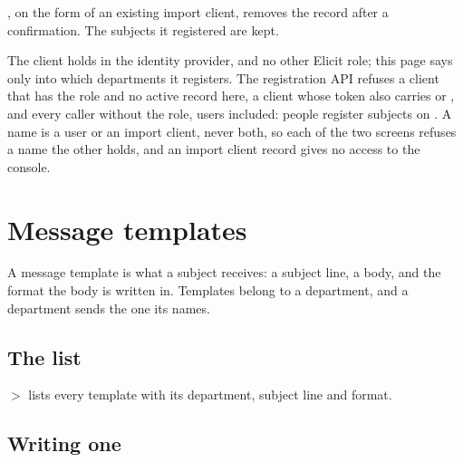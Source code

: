 \documentclass[11pt, a4paper]{article}
\newcommand{\adminonly}{%
  \marginpar{\raggedright\footnotesize\textcolor{elicitVerdigris}{\textsf{Administrator}}}%
}
\begin{document}

, on the form of an existing import client, removes the record after a confirmation.
The subjects it registered are kept.

\begin{elicitnote}
The client holds  in the identity provider, and no other Elicit role;
this page says only into which departments it registers. The registration API refuses a client
that has the role and no active record here, a client whose token also carries
 or , and every caller without the role, users
included: people register subjects on . A name is a user or an import
client, never both, so each of the two screens refuses a name the other holds, and an import
client record gives no access to the console.
\end{elicitnote}

\section{Message templates}\adminonly
\label{sec:templates}

A message template is what a subject receives: a subject line, a body, and the format the body is
written in. Templates belong to a department, and a department sends the one its  names.

\subsection{The list}

 $>$  lists every template with its department, subject line
and format.


\subsection{Writing one}
\end{document}

